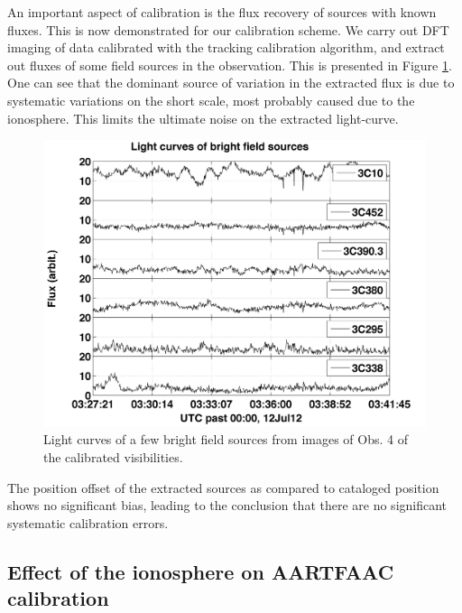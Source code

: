 \documentclass{aa}
\begin{document}
An important  aspect of calibration is  the flux recovery of  sources with known
fluxes. This is  now demonstrated for our calibration scheme.   We carry out DFT
imaging of data calibrated with  the tracking calibration algorithm, and extract
out  fluxes of  some field  sources in  the observation.   This is  presented in
Figure \ref{fig:Light-curves-of}. One can see that  the dominant source of variation in the extracted
flux is  due to systematic variations  on the short scale,  most probably caused
due  to  the  ionosphere.  This  limits  the ultimate  noise  on  the  extracted
light-curve.

\begin{figure}[tbh]
\includegraphics[width=1\columnwidth]{Figs/SB002_LBA_OUTER_SPREAD_1ch_6_convcal_7_el_fftimg_bin_save_mat_tseries}

\caption{\textcolor{red}{\label{fig:Light-curves-of}}Light curves of a few bright
field sources from images of Obs. 4 of the calibrated visibilities.}
\end{figure}
The position offset  of the extracted sources as  compared to cataloged position
shows  no  significant  bias,  leading  to  the conclusion  that  there  are  no
significant systematic calibration errors.


\subsection{\label{sub:iono-effect-on-calib}Effect of the ionosphere on AARTFAAC
calibration}
\end{document}
